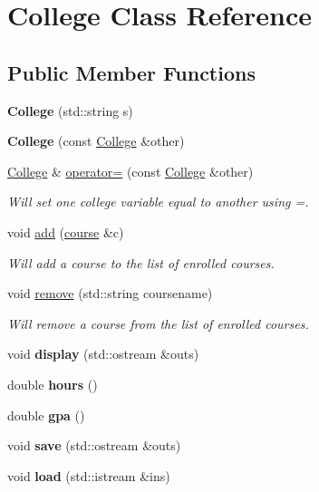 \hypertarget{classCollege}{}\section{College Class Reference}
\label{classCollege}
\subsection*{Public Member Functions}
\begin{DoxyCompactItemize}
\item 
\mbox{\label{classCollege_adabaf4087355e83f9f7d39f1e1498b41}} 
{\bfseries College} (std\+::string s)
\item 
\mbox{\label{classCollege_ad007ad488e5a7ef986114080d0c8e101}} 
{\bfseries College} (const \hyperlink{classCollege}{College} \&other)
\item 
\hyperlink{classCollege}{College} \& \hyperlink{classCollege_af2194c9b37f80d13dc3fdba6784b18e8}{operator=} (const \hyperlink{classCollege}{College} \&other)
\begin{DoxyCompactList}\small\item\em Will set one college variable equal to another using =. \end{DoxyCompactList}\item 
void \hyperlink{classCollege_a67fd1d8970b46b24ce2e0dd72598a22f}{add} (\hyperlink{classcourse}{course} \&c)
\begin{DoxyCompactList}\small\item\em Will add a course to the list of enrolled courses. \end{DoxyCompactList}\item 
void \hyperlink{classCollege_a4d2ae513b36e6421fb1ca2c08459cfe6}{remove} (std\+::string coursename)
\begin{DoxyCompactList}\small\item\em Will remove a course from the list of enrolled courses. \end{DoxyCompactList}\item 
\mbox{\label{classCollege_a52ca0a164483cf5c05591cd0fb8b300c}} 
void {\bfseries display} (std\+::ostream \&outs)
\item 
\mbox{\label{classCollege_a8a7a762611a1d7e00c453390d49355fd}} 
double {\bfseries hours} ()
\item 
\mbox{\label{classCollege_aaf9bfaa0bc717e96da6365661a96fcd0}} 
double {\bfseries gpa} ()
\item 
\mbox{\label{classCollege_af6b419f813bc990c0e11f99b78a26899}} 
void {\bfseries save} (std\+::ostream \&outs)
\item 
\mbox{\label{classCollege_a11422094ddd907705daede7aa537dd73}} 
void {\bfseries load} (std\+::istream \&ins)
\end{DoxyCompactItemize}


